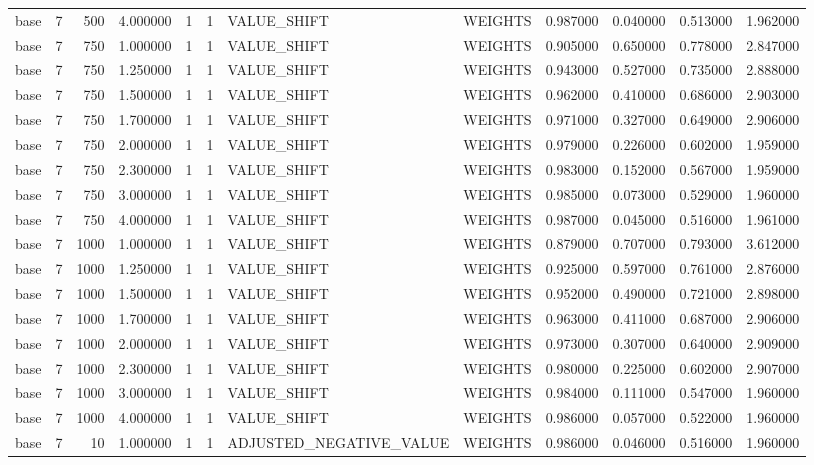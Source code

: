 \begin{tabular}{lrrrllllrrrr}
base & 7 & 500 & 4.000000 & 1 & 1 & VALUE_SHIFT & WEIGHTS & 0.987000 & 0.040000 & 0.513000 & 1.962000 \\
base & 7 & 750 & 1.000000 & 1 & 1 & VALUE_SHIFT & WEIGHTS & 0.905000 & 0.650000 & 0.778000 & 2.847000 \\
base & 7 & 750 & 1.250000 & 1 & 1 & VALUE_SHIFT & WEIGHTS & 0.943000 & 0.527000 & 0.735000 & 2.888000 \\
base & 7 & 750 & 1.500000 & 1 & 1 & VALUE_SHIFT & WEIGHTS & 0.962000 & 0.410000 & 0.686000 & 2.903000 \\
base & 7 & 750 & 1.700000 & 1 & 1 & VALUE_SHIFT & WEIGHTS & 0.971000 & 0.327000 & 0.649000 & 2.906000 \\
base & 7 & 750 & 2.000000 & 1 & 1 & VALUE_SHIFT & WEIGHTS & 0.979000 & 0.226000 & 0.602000 & 1.959000 \\
base & 7 & 750 & 2.300000 & 1 & 1 & VALUE_SHIFT & WEIGHTS & 0.983000 & 0.152000 & 0.567000 & 1.959000 \\
base & 7 & 750 & 3.000000 & 1 & 1 & VALUE_SHIFT & WEIGHTS & 0.985000 & 0.073000 & 0.529000 & 1.960000 \\
base & 7 & 750 & 4.000000 & 1 & 1 & VALUE_SHIFT & WEIGHTS & 0.987000 & 0.045000 & 0.516000 & 1.961000 \\
base & 7 & 1000 & 1.000000 & 1 & 1 & VALUE_SHIFT & WEIGHTS & 0.879000 & 0.707000 & 0.793000 & 3.612000 \\
base & 7 & 1000 & 1.250000 & 1 & 1 & VALUE_SHIFT & WEIGHTS & 0.925000 & 0.597000 & 0.761000 & 2.876000 \\
base & 7 & 1000 & 1.500000 & 1 & 1 & VALUE_SHIFT & WEIGHTS & 0.952000 & 0.490000 & 0.721000 & 2.898000 \\
base & 7 & 1000 & 1.700000 & 1 & 1 & VALUE_SHIFT & WEIGHTS & 0.963000 & 0.411000 & 0.687000 & 2.906000 \\
base & 7 & 1000 & 2.000000 & 1 & 1 & VALUE_SHIFT & WEIGHTS & 0.973000 & 0.307000 & 0.640000 & 2.909000 \\
base & 7 & 1000 & 2.300000 & 1 & 1 & VALUE_SHIFT & WEIGHTS & 0.980000 & 0.225000 & 0.602000 & 2.907000 \\
base & 7 & 1000 & 3.000000 & 1 & 1 & VALUE_SHIFT & WEIGHTS & 0.984000 & 0.111000 & 0.547000 & 1.960000 \\
base & 7 & 1000 & 4.000000 & 1 & 1 & VALUE_SHIFT & WEIGHTS & 0.986000 & 0.057000 & 0.522000 & 1.960000 \\
base & 7 & 10 & 1.000000 & 1 & 1 & ADJUSTED_NEGATIVE_VALUE & WEIGHTS & 0.986000 & 0.046000 & 0.516000 & 1.960000 \\

\end{tabular}
